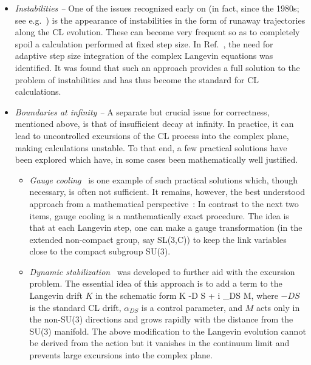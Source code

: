 \documentclass[../main.tex]{subfiles}
\begin{document}
\begin{itemize}

\item {\it Instabilities --} One of the issues recognized early on (in fact, since the 1980s; see e.g.~\cite{Ambjorn:1985cv, Ambjorn:1985iw}) is the appearance of instabilities in the form of runaway trajectories
along the CL evolution. These can become very frequent so as to completely spoil a calculation performed
at fixed step size. In Ref.~\cite{AARTS2010154}, the need for adaptive step size integration of the complex Langevin equations
was identified. It was found that such an approach provides a full solution to the problem of instabilities and has thus
become the standard for CL calculations.

\item {\it Boundaries at infinity --} A separate but crucial issue for correctness, mentioned above, is that of insufficient decay at infinity. In practice, it can lead to uncontrolled
excursions of the CL process into the complex plane, making calculations unstable. To that end, a few practical solutions have been explored which
have, in some cases been mathematically well justified.

\begin{itemize}
\item {\it Gauge cooling}~\cite{SeilerGaugeCooling, Bongiovanni:2013nxa, PhysRevD.92.085020, Nagata:2015uga, Nagata:2016alq}
is one example of such practical solutions which, though necessary, is often not sufficient. It remains, however, the best
understood approach from a mathematical perspective~\cite{Nagata:2015uga}: In contrast to the next two items, gauge cooling is a
mathematically exact procedure. The idea is that at each Langevin step, one can make a gauge transformation (in the extended
non-compact group, say SL(3,C)) to keep the link variables close to the compact subgroup SU(3).


\item {\it Dynamic stabilization}~\cite{Aarts:2016qhx, Lattice2016AttanasioJager, Lattice2017AttanasioJager, Attanasio2019} was developed to further aid with
the excursion problem. The essential idea of this approach is to add a term to the Langevin drift $K$ in the schematic form
%
\beq
K \to -D S + i \alpha_{DS} M,
\eeq
%
where $-D S$ is the standard CL drift, $\alpha_{DS}$ is a control parameter, and $M$ acts only in the non-SU(3) directions and grows rapidly
with the distance from the SU(3) manifold. The above modification to the Langevin evolution cannot be derived from
the action but it vanishes in the continuum limit and prevents large excursions into the complex plane.


\end{itemize}
\end{itemize}
\end{document}
